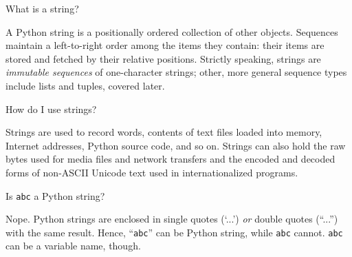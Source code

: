 \documentclass[a4paper,11pt]{book}
\newcommand{\question}[1]{%
    \begin{tcolorbox}[colback=comp_c!10,colframe=comp_c,sidebyside align=top,width=\linewidth,before skip=1ex]
        #1
    \end{tcolorbox}
    \switchcolumn%
}
\newcommand{\note}[1]{%
    \begin{tcolorbox}[colback=white!0,colframe=white!10,width=\linewidth,before skip=1ex]
        #1
    \end{tcolorbox}
}
\begin{document}
\begin{paracol}{2}
	\question{What is a string?}
	\note{A Python string is a positionally ordered collection of other objects. Sequences maintain a left-to-right order among the items they contain: their items are stored and fetched by their relative positions. Strictly speaking, strings are \textit{immutable sequences} of one-character strings; other, more general sequence types include lists and tuples, covered later.}
\end{paracol}

\begin{paracol}{2}
	\question{How do I use strings?}
	\note{Strings are used to record words, contents of text files loaded into memory, Internet addresses, Python source code, and so on. Strings can also hold the raw bytes used for media files and network transfers and the encoded and decoded forms of non-ASCII Unicode text used in internationalized programs.}
\end{paracol}

\begin{paracol}{2}
	\question{Is \texttt{abc} a Python string?}
	\note{Nope. Python strings are enclosed in single quotes (`...') \textit{or} double quotes (``...'') with the same result. Hence, ``\texttt{abc}'' can be Python string, while \texttt{abc} cannot. \texttt{abc} can be a variable name, though.}
\end{paracol}
\clearpage
\end{document}
